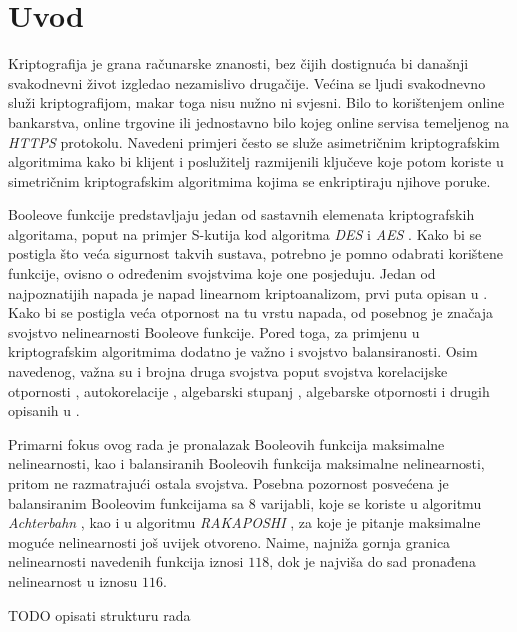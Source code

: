 \chapter{Uvod}
Kriptografija je grana računarske znanosti, bez čijih dostignuća bi današnji svakodnevni život izgledao nezamislivo drugačije.
Većina se ljudi svakodnevno služi kriptografijom, makar toga nisu nužno ni svjesni.
Bilo to korištenjem online bankarstva, online trgovine ili jednostavno bilo kojeg online servisa temeljenog na \textit{HTTPS} protokolu.
Navedeni primjeri često se služe asimetričnim kriptografskim algoritmima kako bi klijent i poslužitelj razmijenili ključeve koje potom koriste u simetričnim kriptografskim algoritmima kojima se enkriptiraju njihove poruke.

Booleove funkcije predstavljaju jedan od sastavnih elemenata kriptografskih algoritama, poput na primjer S-kutija kod algoritma \textit{DES} i \textit{AES} \cite{daemen1999aes}.
Kako bi se postigla što veća sigurnost takvih sustava, potrebno je pomno odabrati korištene funkcije, ovisno o određenim svojstvima koje one posjeduju.
Jedan od najpoznatijih napada je napad linearnom kriptoanalizom, prvi puta opisan u \cite{golic1994linear}.
Kako bi se postigla veća otpornost na tu vrstu napada, od posebnog je značaja svojstvo nelinearnosti Booleove funkcije.
Pored toga, za primjenu u kriptografskim algoritmima dodatno je važno i svojstvo balansiranosti.
Osim navedenog, važna su i brojna druga svojstva poput svojstva korelacijske otpornosti , autokorelacije , algebarski stupanj , algebarske otpornosti  i drugih opisanih u \cite{CryptographicBooleanFunctions}.

Primarni fokus ovog rada je pronalazak Booleovih funkcija maksimalne nelinearnosti, kao i balansiranih Booleovih funkcija maksimalne nelinearnosti, pritom ne razmatrajući ostala svojstva.
Posebna pozornost posvećena je balansiranim Booleovim funkcijama sa $8$ varijabli, koje se koriste u algoritmu \textit{Achterbahn} \cite{gammel2005achterbahn}, kao i u algoritmu \textit{RAKAPOSHI} \cite{cid2009rakaposhi}, za koje je pitanje maksimalne moguće nelinearnosti još uvijek otvoreno.
Naime, najniža gornja granica nelinearnosti navedenih funkcija iznosi $118$, dok je najviša do sad pronađena nelinearnost u iznosu $116$.

TODO opisati strukturu rada